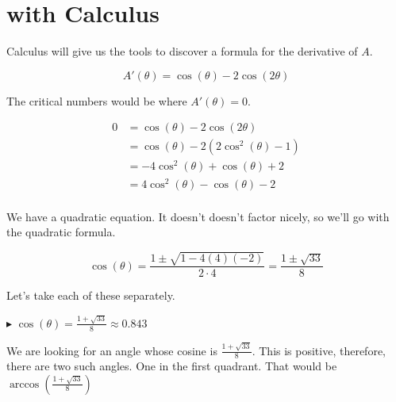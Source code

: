 \documentclass{ximera}
\begin{document}
\section{with Calculus}

Calculus will give us the tools to discover a formula for the derivative of $A$.


\[   A'(\theta) = \cos(\theta)-2 \cos(2\theta)    \]


The critical numbers would be where $A'(\theta) = 0$.



\begin{align*}
0    & = \cos(\theta)-2 \cos(2\theta)   \\
     & = \cos(\theta) - 2 (2 \cos^2(\theta) - 1)    \\
     & = -4 \cos^2(\theta) + \cos(\theta) + 2   \\
     & = 4 \cos^2(\theta) - \cos(\theta) - 2   \\
\end{align*}


We have a quadratic equation.  It doesn't doesn't factor nicely, so we'll go with the quadratic formula.



\[   \cos(\theta) = \frac{1 \pm \sqrt{1 - 4 (4)(-2)}}{2 \cdot 4}  = \frac{1 \pm \sqrt{33}}{8}        \]




Let's take each of these separately.



$\blacktriangleright$  $\cos(\theta) = \frac{1 + \sqrt{33}}{8}   \approx  0.843$


We are looking for an angle whose cosine is $\frac{1 + \sqrt{33}}{8}$.  This is positive, therefore, there are two such angles. One in the first quadrant.  That would be $\arccos\left(\frac{1 + \sqrt{33}}{8}\right)$
\end{document}
